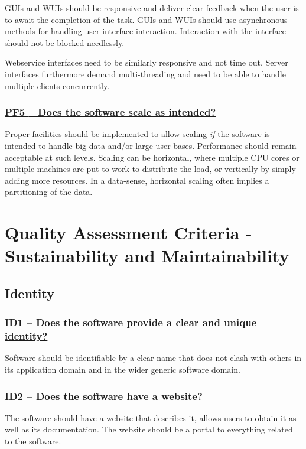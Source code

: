 \documentclass[a4paper,11pt]{article}
\newcommand{\indicator}[1]{\subsubsection*{\underline{#1}}}
\begin{document}
GUIs and WUIs should be responsive and deliver clear feedback when the user is
to await the completion of the task. GUIs and WUIs should use asynchronous methods for
handling user-interface interaction. Interaction with the interface should not
be blocked needlessly.

Webservice interfaces need to be similarly responsive and not time out. Server interfaces furthermore demand multi-threading and need to be able to handle
multiple clients concurrently.

\newcommand{\pfFiveName}{PF5}
\newcommand{\pfFiveID}{\pfFiveName}
\newcommand{\pfFiveText}{Does the software scale as intended?}
\indicator{\pfFiveName{ }--{ }\pfFiveText}\label{id:pf5} 

Proper facilities should be implemented to allow scaling \emph{if} the software is
intended to handle big data and/or large user bases. Performance should remain
acceptable at such levels.  Scaling can be horizontal, where multiple CPU cores
or multiple machines are put to work to distribute the load, or vertically by
simply adding more resources. In a data-sense, horizontal scaling often implies
a partitioning of the data.

\section{Quality Assessment Criteria - Sustainability and Maintainability}

\subsection{Identity}\label{sec:ide}

\newcommand{\idOneName}{ID1}
\newcommand{\idOneID}{\idOneName}
\newcommand{\idOneText}{Does the software provide a clear and unique identity?}
\indicator{\idOneName{ }--{ }\idOneText}\label{id:id1} 

Software should be identifiable by a clear name that does not clash with others
in its application domain and in the wider generic software domain. 

\newcommand{\idTwoName}{ID2}
\newcommand{\idTwoID}{\idTwoName}
\newcommand{\idTwoText}{Does the software have a website?}
\indicator{\idTwoName{ }--{ }\idTwoText}\label{id:id2} 

The software should have a website that describes it, allows users to obtain
it as well as its documentation. The website should be a portal to everything
related to the software.
\end{document}
